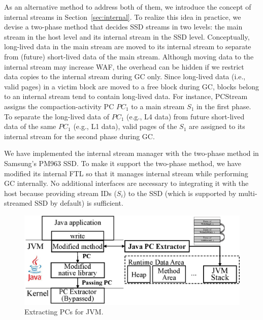 As an alternative method to address both of them, we introduce the concept of
internal streams in Section~\ref{sec:internal}. To realize this idea in practice, we devise a
two-phase method that decides SSD streams in two levels: the main stream in the
host level and its internal stream in the SSD level.  Conceptually, long-lived
data in the main stream are moved to its internal stream to separate from
(future) short-lived data of the main stream.  Although moving data to the
internal stream may increase WAF, the overhead can be hidden if we restrict
data copies to the internal stream during GC only.  Since long-lived data
(i.e., valid pages) in a victim block are moved to a free block during GC,
blocks belong to an internal stream tend to contain long-lived data.  For
instance, \textsf{\small PCStream} assigns the compaction-activity PC {\it
$PC_1$} to a main stream {\it $S_1$} in the first phase.  To separate the
long-lived data of {\it $PC_1$} (e.g., L4 data) from future short-lived data of
the same {\it $PC_1$} (e.g., L1 data), valid pages of the {\it $S_1$} are
assigned to its internal stream for the second phase during GC.

We have implemented the internal stream manager with the two-phase method in
Samsung's PM963 SSD. To make it support the two-phase method, we
have modified its internal FTL so that it manages internal stream while
performing GC internally. No additional interfaces are necessary to integrating
it with the host because providing stream IDs (\textit{$S_i$}) to the SSD (which
is supported by multi-streamed SSD by default) is sufficient.


\begin{figure}[t]
\centering
	\includegraphics[width=0.9\linewidth]{figure/jvmpc}
	\caption{Extracting PCs for JVM.}
\label{fig:java}
	\vspace{-20pt}
\end{figure}


